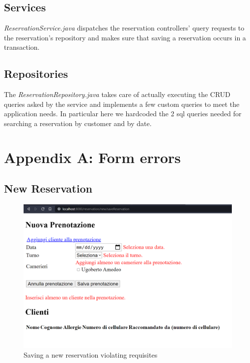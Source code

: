 \documentclass{article}
\begin{document}
\subsection*{Services}
\textit{ReservationService.java} dispatches the reservation controllers' query requests to the reservation's repository 
and makes sure that saving a reservation occurs in a transaction.


\subsection*{Repositories}
The \textit{ReservationRepository.java} takes care of actually executing the CRUD queries
asked by the service and implements a few custom queries to meet the application needs.
In particular here we hardcoded the 2 sql queries needed for searching a reservation
by customer and by date.








\newpage
\section*{Appendix A: Form errors}

\vspace{5mm}
\subsection*{New Reservation}
\label{sec:new_reservation_form_errors}
\begin{figure}[H]
    \centering
    \includegraphics[width=\textwidth]{new_reservation_form_errors}
    \caption{Saving a new reservation violating requisites}
    \label{fig:new_reservation_form_errors}
\end{figure}
\end{document}
